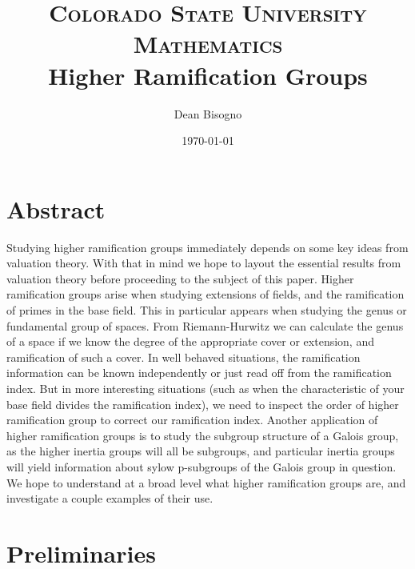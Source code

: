 \documentclass[paper=a4, fontsize=11pt]{scrartcl} %
\title{	
\normalfont \normalsize 
\textsc{Colorado State University Mathematics} \\ [25pt] %
\huge Higher Ramification Groups \\ %
}
\author{Dean Bisogno} %
\date{\normalsize\today} %
\numberwithin{equation}{section} %
\numberwithin{figure}{section} %
\numberwithin{table}{section} %
\theoremstyle{break}
\begin{document}
\maketitle %
\section{Abstract}
Studying higher ramification groups immediately depends on some key ideas from valuation theory. With that in mind we hope to layout the essential results from valuation theory before proceeding to the subject of this paper. Higher ramification groups arise when studying extensions of fields, and the ramification of primes in the base field. This in particular appears when studying the genus or fundamental group of spaces. From Riemann-Hurwitz we can calculate the genus of a space if we know the degree of the appropriate cover or extension, and ramification of such a cover. In well behaved situations, the ramification information can be known independently or just read off from the ramification index. But in more interesting situations (such as when the characteristic of your base field divides the ramification index), we need to inspect the order of higher ramification group to correct our ramification index. Another application of higher ramification groups is to study the subgroup structure of a Galois group, as the higher inertia groups will all be subgroups, and particular inertia groups will yield information about sylow p-subgroups of the Galois group in question. We hope to understand at a broad level what higher ramification groups are, and investigate a couple examples of their use.
\section{Preliminaries}
\end{document}
